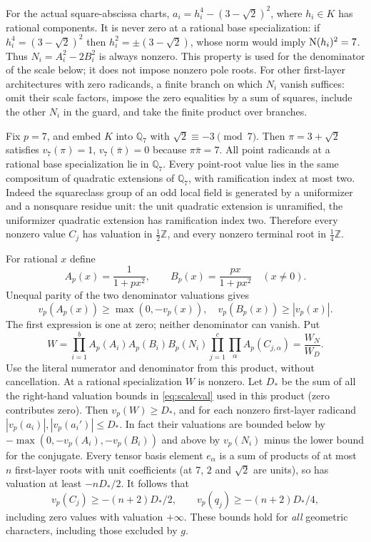\documentclass[11pt]{article}
\newcommand{\Q}{\mathbb Q}\newcommand{\Z}{\mathbb Z}\newcommand{\N}{\mathbb N}
\begin{document}
For the actual square-abscissa charts, $a_i=h_i^4-(3-\sqrt2)^2$,
where $h_i\in K$ has rational components. It is never zero at a rational
base specialization: if $h_i^4=(3-\sqrt2)^2$ then
$h_i^2=\pm(3-\sqrt2)$, whose norm would imply $\operatorname{N}(h_i)^2=7$.
Thus $N_i=A_i^2-2B_i^2$ is always nonzero. This property is used for
the denominator of the scale below; it does not impose nonzero pole
roots. For other first-layer architectures with zero radicands, a
finite branch on which $N_i$ vanish suffices: omit their scale factors,
impose the zero equalities by a sum of squares, include the other $N_i$
in the guard, and take the finite product over branches.

Fix $p=7$, and embed $K$ into $\Q_7$ with $\sqrt2\equiv-3\pmod7$.
Then $\pi=3+\sqrt2$ satisfies $v_7(\pi)=1$, $v_7(\bar\pi)=0$ because
$\pi\bar\pi=7$. All point radicands at a rational base specialization
lie in $\Q_7$. Every point-root value lies in the same compositum of
quadratic extensions of $\Q_7$, with ramification index at most two.
Indeed the squareclass group of an odd local field is generated by
a uniformizer and a nonsquare residue unit: the unit quadratic extension
is unramified, the uniformizer quadratic extension has ramification
index two. Therefore every nonzero value $C_j$ has valuation in
$\tfrac12\Z$, and every nonzero terminal root in $\tfrac14\Z$.

For rational $x$ define
\[
 A_p(x)=\frac1{1+px^2},\qquad
 B_p(x)=\frac{px}{1+px^2}\quad (x\ne0).
\]
Unequal parity of the two denominator valuations gives
\begin{equation}\label{eq:scaleval}
 v_p(A_p(x))\ge\max(0,-v_p(x)),\quad
 v_p(B_p(x))\ge |v_p(x)|.
\end{equation}
The first expression is one at zero; neither denominator can vanish.
Put
\begin{equation}\label{eq:scale}
 W=\prod_{i=1}^b A_p(A_i)A_p(B_i)B_p(N_i)
     \prod_{j=1}^c\prod_\alpha A_p(C_{j,\alpha})=\frac{W_N}{W_D}.
\end{equation}
Use the literal numerator and denominator from this product, without
cancellation. At a rational specialization $W$ is nonzero. Let
$D_*$ be the sum of all the right-hand valuation bounds in
\eqref{eq:scaleval} used in this product (zero contributes zero).
Then $v_p(W)\ge D_*$, and for each nonzero first-layer radicand
$|v_p(a_i)|,|v_p(a_i')|\le D_*$. In fact their valuations are bounded
below by $-\max(0,-v_p(A_i),-v_p(B_i))$ and above by $v_p(N_i)$
minus the lower bound for the conjugate. Every tensor basis element
$e_\alpha$ is a sum of products of at most $n$ first-layer roots
with unit coefficients (at 7, $2$ and $\sqrt2$ are units), so has
valuation at least $-nD_*/2$. It follows that
\begin{equation}\label{eq:terminalbound}
 v_p(C_j)\ge-(n+2)D_*/2,\qquad
 v_p(q_j)\ge-(n+2)D_*/4,
\end{equation}
including zero values with valuation $+\infty$. These bounds hold for
\emph{all} geometric characters, including those excluded by $g$.
\end{document}
